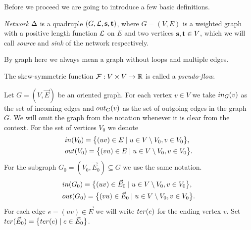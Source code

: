 \documentclass[12pt,oneside,a4paper]{amsart}
\begin{document}
      Before we proceed we are going to introduce a few basic definitions.
      \begin{definition}
        \emph{Network} $\Delta$ is a quadruple $(G, \mathcal{L}, \mathbf{s}, \mathbf{t})$, where $G = (V, E)$ is a weighted graph
        with a positive length function $\mathcal{L}$ on $E$ and two vertices $\mathbf{s}, \mathbf{t} \in V$, which
        we will call \emph{source} and \emph{sink} of the network respectively.
      \end{definition}
      By graph here we always mean a graph without loops and multiple edges.
      \begin{definition}
        The skew-symmetric function $\mathcal{F}: V \times V \to \mathbb{R}$ is called a \emph{pseudo-flow}.
      \end{definition}
      \begin{definition}
        Let $G = (V, \vec{E})$ be an oriented graph.
        For each vertex $v \in V$ we take $in_G(v)$ as the set of incoming edges
          and $out_G(v)$ as the set of outgoing edges in the graph $G$.
        We will omit the graph from the notation whenever it is clear from the context.
        For the set of vertices $V_0$ we denote
        \begin{align*}
          &in(V_0) = \big\{(uv)\in E \mid u \in V \setminus V_0, v \in V_0\big\},\\
          &out(V_0) = \big\{(vu) \in E \mid u \in V\setminus V_0, v \in V_0\big\}.
        \end{align*}
        For the subgraph $G_0 = (V_0, \vec{E}_0) \subseteq G$ we use the same notation.
        \begin{align*}
          &in(G_0) = \big\{(uv)\in \vec{E}_0 \mid u \in V \setminus V_0, v \in V_0\big\},\\
          &out(G_0) = \big\{(vu) \in \vec{E}_0 \mid u \in V\setminus V_0, v \in V_0\big\}.
        \end{align*}
        For each edge $e=(uv) \in \vec{E}$ we will write %
          $ter(e)$ for the ending vertex $v$.
        Set $ter(\vec{E}_0) = \big\{ter(e) \mid e\in \vec{E}_0\big\}$.
      \end{definition}
\end{document}
